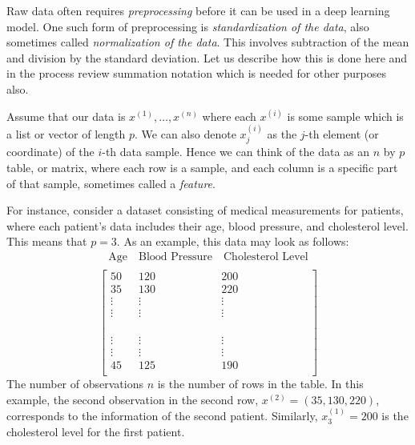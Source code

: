Raw data often requires \textit{preprocessing} before it can be used in a deep learning model. One such form of preprocessing is \textit{standardization of the data}, also sometimes called \textit{normalization of the data}. This involves subtraction of the mean and division by the standard deviation. Let us describe how this is done here and in the process review summation notation which is needed for other purposes also.

Assume that our data is $x^{(1)}, \ldots, x^{(n)}$ where each $x^{(i)}$ is some sample which is a list or vector of length $p$. We can also denote $x_j^{(i)}$ as the $j$-th element (or coordinate) of the $i$-th data sample. Hence we can think of the data as an $n$ by $p$ table, or matrix, where each row is a sample, and each column is a specific part of that sample, sometimes called a {\em feature}.

For instance, consider a dataset consisting of medical measurements for patients, where each patient's data includes their age, blood pressure, and cholesterol level. This means that $p=3$. As an example, this data may look as follows:
%
\[
\begin{array}{c}
\text{Age} \quad \text{Blood Pressure} \quad \text{Cholesterol Level} \\
\end{array}
\]
\begin{equation}
\label{eq:data-table}
\left[ \begin{array}{ccc}
50 & 120 & 200 \\
35 & 130 & 220 \\
\vdots & \vdots & \vdots \\
\vdots & \vdots & \vdots \\
\phantom{\text{Age}} & \phantom{\text{Blood Pressure}} & \phantom{\text{Cholesterol Level}}\\
\vdots & \vdots & \vdots \\
\vdots & \vdots & \vdots \\
45 & 125 & 190 \\
\end{array} \right]
\end{equation}
%
The number of observations $n$ is the number of rows in the table.
In this example, the second observation in the second row, $x^{(2)}= (35,130,220)$, corresponds to the information of the second patient. Similarly, $x_3^{(1)} = 200$ is the cholesterol level for the first patient. 

